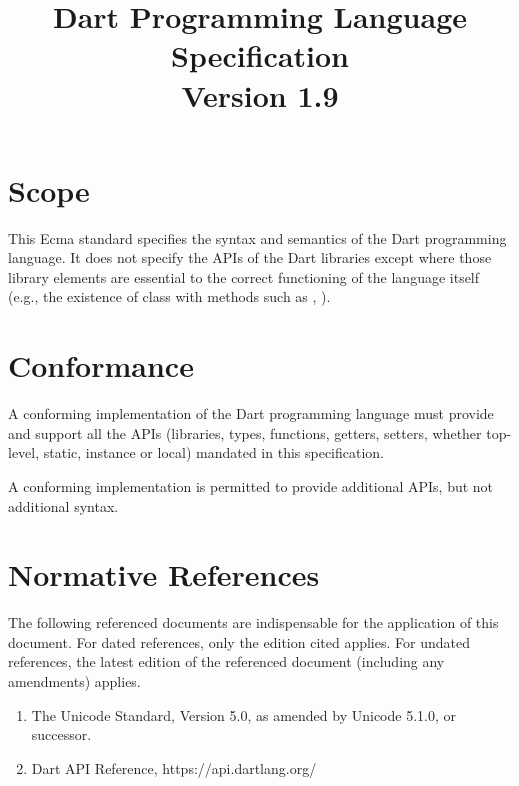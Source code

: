 \documentclass{article}
\title{Dart Programming Language  Specification \\
{\large Version 1.9}}
\begin{document}
\maketitle
\tableofcontents


\newpage

\pagestyle{myheadings}

\section{Scope}

\LMHash{}
This Ecma standard specifies the syntax and semantics of the Dart programming language.  It does not specify the APIs of the Dart libraries except where those library elements are essential to the correct functioning of the language itself (e.g., the existence of class  with methods such as , ).

\section{Conformance}

\LMHash{}
A conforming  implementation of the Dart programming language must provide and support all the  APIs (libraries, types, functions, getters, setters, whether top-level, static, instance or local) mandated in this specification. 

\LMHash{}
A conforming implementation is permitted to provide additional APIs, but not additional syntax.


\section{Normative References}

\LMHash{}
The following referenced documents are indispensable for the application of this document. For dated references, only the edition cited applies. For undated references, the latest edition of the referenced document (including any amendments) applies.

\begin{enumerate}
\item
The Unicode Standard, Version 5.0, as amended by Unicode 5.1.0, or successor.
\item
Dart API Reference, https://api.dartlang.org/
\end{enumerate}
\end{document}
